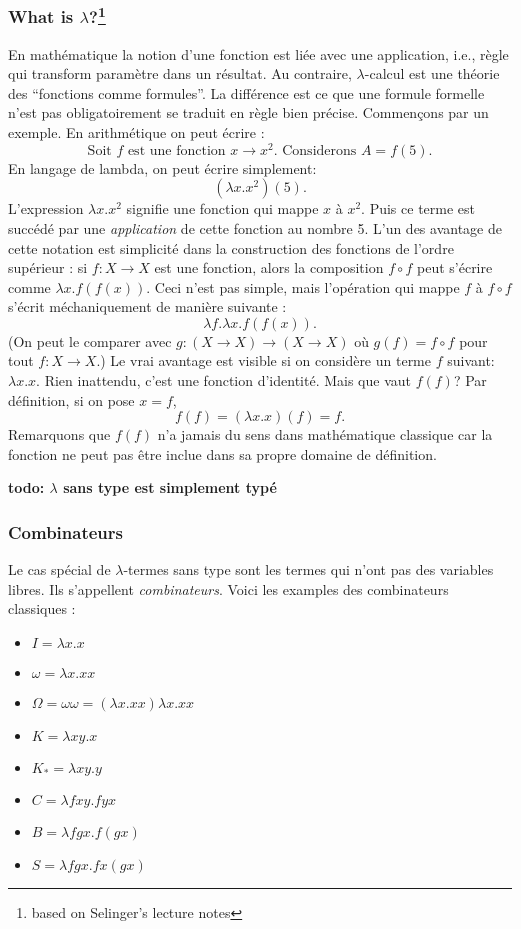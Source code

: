 \documentclass[12pt, a4paper]{article}
\begin{document}
\subsubsection*{What is $\lambda$?\footnote{based on Selinger's lecture notes}}
En mathématique la notion d'une fonction est liée avec une application, i.e., règle qui transform paramètre dans un résultat.
Au contraire, $\lambda$-calcul est une théorie des ``fonctions comme formules''. La différence est ce que une formule formelle n'est pas obligatoirement se traduit en règle bien précise.
Commençons par un exemple.
En arithmétique on peut écrire : 
$$\text{Soit $f$ est une fonction $x \to x^2$. Considerons $A = f(5)$.}$$
En langage de lambda, on peut écrire simplement: $$(\lambda x.x^2) (5).$$
L'expression $\lambda x.x^2$ signifie une fonction qui mappe $x$ à $x^2$.
Puis ce terme est succédé par une \emph{application} de cette fonction au nombre 5.
L'un des avantage de cette notation est simplicité dans la construction des fonctions de l'ordre supérieur : si $f: X \to X$ est une fonction, alors la composition $f \circ f$ peut s'écrire comme $\lambda x.f(f(x))$.
Ceci n'est pas simple, mais l'opération qui mappe $f$ à $f \circ f$ s'écrit méchaniquement de manière suivante :
$$\lambda f. \lambda x.f(f(x)).$$
(On peut le comparer avec $g: (X \to X) \to (X \to X)$ où $g(f) = f \circ f$ pour tout $f: X \to X$.)
Le vrai avantage est visible si on considère un terme $f$ suivant: $\lambda x.x$.
Rien inattendu, c'est une fonction d'identité.
Mais que vaut $f(f)$?
Par définition, si on pose $x = f$,
$$f(f) = (\lambda x.x)(f) = f.$$
Remarquons que $f(f)$ n'a jamais du sens dans mathématique classique car la fonction ne peut pas être inclue dans sa propre domaine de définition.

\textbf{todo: $\lambda$ sans type est simplement typé}

\subsubsection*{Combinateurs}
Le cas spécial de $\lambda$-termes sans type sont les termes qui n'ont pas des variables libres. Ils s'appellent \emph{combinateurs}.
Voici les examples des combinateurs classiques :
\begin{itemize}
	\item $I = \lambda x. x$
	\item $\omega = \lambda x. xx$
	\item $\Omega = \omega \omega = (\lambda x. xx) \lambda x. xx$
	\item $K = \lambda x y. x$
	\item $K_* = \lambda x y. y$
	\item $C = \lambda fxy. fyx$
	\item $B = \lambda fgx. f(gx)$
	\item $S = \lambda fgx. fx(gx)$
\end{itemize}
\end{document}
